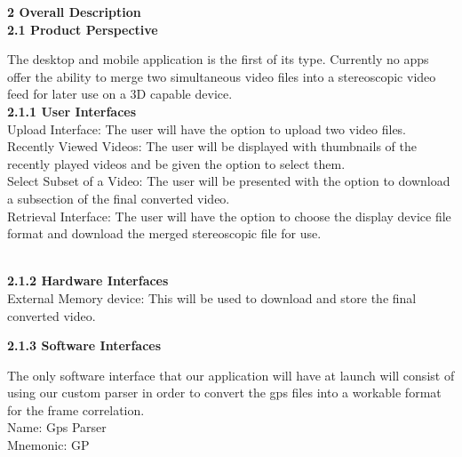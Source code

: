 \documentclass[10pt,draftclsnofoot,onecolumn]{IEEEtran}
\begin{document}
{\Large\textbf{2 Overall Description}} \\
\vspace{5mm}
{\Medium\textbf{2.1 Product Perspective}} \\
\vspace{5mm}

The desktop and mobile application is the first of its type. Currently no apps offer the ability to merge two simultaneous video files into a stereoscopic video feed for later use on a 3D capable device.\\ 
\vspace{5mm}
{\Medium\textbf{2.1.1 User Interfaces}} \\

\vspace{5mm}
Upload Interface: The user will have the option to upload two video files.\\
\vspace{2mm}
			Recently Viewed Videos: The user will be displayed with thumbnails of the recently played videos and be given the option to select them.\\
			\vspace{2mm}
Select Subset of a Video: The user will be presented with the option to download a subsection of the final converted video.	\\
\vspace{2mm}
Retrieval Interface: The user will have the option to choose the display device file format and download the merged stereoscopic file for use.

\\
\vspace{5mm}
{\Medium\textbf{2.1.2 Hardware Interfaces}} \\

\vspace{5mm}
External Memory device: This will be used to download and store the final converted video.
\vspace{5mm}


{\Medium\textbf{2.1.3 Software Interfaces}} \\

\vspace{5mm}

The only software interface that our application will have at launch will consist of using our custom parser in order to convert the gps files into a workable format for the frame correlation. \\
			Name: Gps Parser\\
			Mnemonic: GP\\
\end{document}
